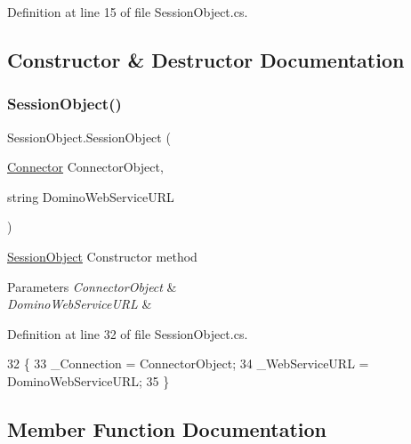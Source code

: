 Definition at line 15 of file Session\+Object.\+cs.



\subsection{Constructor \& Destructor Documentation}
\mbox{\label{class_session_object_a173822a7aec467880195d79a1bc9f520}} 
\subsubsection{\texorpdfstring{Session\+Object()}{SessionObject()}}
{\footnotesize\ttfamily Session\+Object.\+Session\+Object (\begin{DoxyParamCaption}\item[{\hyperlink{class_connector}{Connector}}]{Connector\+Object,  }\item[{string}]{Domino\+Web\+Service\+U\+RL }\end{DoxyParamCaption})}



\hyperlink{class_session_object}{Session\+Object} Constructor method 


\begin{DoxyParams}{Parameters}
{\em Connector\+Object} & \\
\hline
{\em Domino\+Web\+Service\+U\+RL} & \\
\hline
\end{DoxyParams}


Definition at line 32 of file Session\+Object.\+cs.


\begin{DoxyCode}
32                                                                                 \{
33         \_Connection = ConnectorObject;
34         \_WebServiceURL = DominoWebServiceURL;
35     \}
\end{DoxyCode}


\subsection{Member Function Documentation}
\mbox{\label{class_session_object_aa4871ea2dac4215bef0274a2bd71ae72}} 
